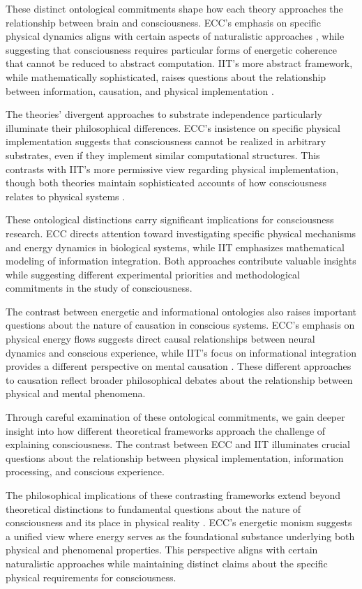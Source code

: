 These distinct ontological commitments shape how each theory approaches the relationship between brain and consciousness. ECC's emphasis on specific physical dynamics aligns with certain aspects of naturalistic approaches \cite{Goff2019}, while suggesting that consciousness requires particular forms of energetic coherence that cannot be reduced to abstract computation. IIT's more abstract framework, while mathematically sophisticated, raises questions about the relationship between information, causation, and physical implementation \cite{Tononi2015}.

The theories' divergent approaches to substrate independence particularly illuminate their philosophical differences. ECC's insistence on specific physical implementation suggests that consciousness cannot be realized in arbitrary substrates, even if they implement similar computational structures. This contrasts with IIT's more permissive view regarding physical implementation, though both theories maintain sophisticated accounts of how consciousness relates to physical systems \cite{Strawson2006}.

These ontological distinctions carry significant implications for consciousness research. ECC directs attention toward investigating specific physical mechanisms and energy dynamics in biological systems, while IIT emphasizes mathematical modeling of information integration. Both approaches contribute valuable insights while suggesting different experimental priorities and methodological commitments in the study of consciousness.

The contrast between energetic and informational ontologies also raises important questions about the nature of causation in conscious systems. ECC's emphasis on physical energy flows suggests direct causal relationships between neural dynamics and conscious experience, while IIT's focus on informational integration provides a different perspective on mental causation \cite{Tononi2008}. These different approaches to causation reflect broader philosophical debates about the relationship between physical and mental phenomena.

Through careful examination of these ontological commitments, we gain deeper insight into how different theoretical frameworks approach the challenge of explaining consciousness. The contrast between ECC and IIT illuminates crucial questions about the relationship between physical implementation, information processing, and conscious experience.

The philosophical implications of these contrasting frameworks extend beyond theoretical distinctions to fundamental questions about the nature of consciousness and its place in physical reality \cite{Skrbina2017}. ECC's energetic monism suggests a unified view where energy serves as the foundational substance underlying both physical and phenomenal properties. This perspective aligns with certain naturalistic approaches while maintaining distinct claims about the specific physical requirements for consciousness.

